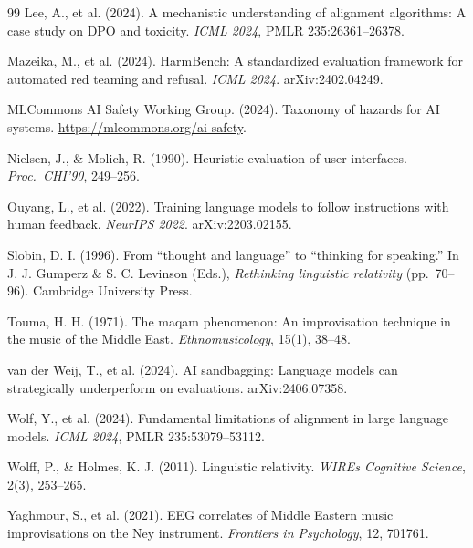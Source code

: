 \documentclass[11pt,a4paper]{article}
\begin{document}
\begin{thebibliography}{99}
Lee, A., et al. (2024).
A mechanistic understanding of alignment algorithms: A case study on DPO and toxicity.
\textit{ICML 2024}, PMLR 235:26361--26378.

Mazeika, M., et al. (2024).
HarmBench: A standardized evaluation framework for automated red teaming and refusal.
\textit{ICML 2024}. arXiv:2402.04249.

MLCommons AI Safety Working Group. (2024).
Taxonomy of hazards for AI systems.
\url{https://mlcommons.org/ai-safety}.

Nielsen, J., \& Molich, R. (1990).
Heuristic evaluation of user interfaces.
\textit{Proc.\ CHI'90}, 249--256.

Ouyang, L., et al. (2022).
Training language models to follow instructions with human feedback.
\textit{NeurIPS 2022}. arXiv:2203.02155.

Slobin, D. I. (1996).
From ``thought and language'' to ``thinking for speaking.''
In J. J. Gumperz \& S. C. Levinson (Eds.), \textit{Rethinking linguistic relativity} (pp.\ 70--96).
Cambridge University Press.

Touma, H. H. (1971).
The maqam phenomenon: An improvisation technique in the music of the Middle East.
\textit{Ethnomusicology}, 15(1), 38--48.

van der Weij, T., et al. (2024).
AI sandbagging: Language models can strategically underperform on evaluations.
arXiv:2406.07358.

Wolf, Y., et al. (2024).
Fundamental limitations of alignment in large language models.
\textit{ICML 2024}, PMLR 235:53079--53112.

Wolff, P., \& Holmes, K. J. (2011).
Linguistic relativity.
\textit{WIREs Cognitive Science}, 2(3), 253--265.

Yaghmour, S., et al. (2021).
EEG correlates of Middle Eastern music improvisations on the Ney instrument.
\textit{Frontiers in Psychology}, 12, 701761.

\end{thebibliography}
\end{document}
